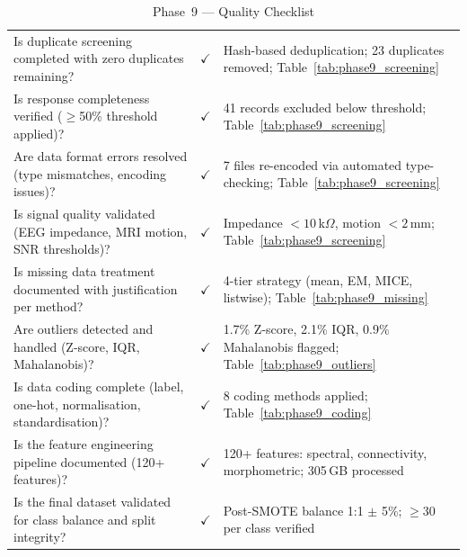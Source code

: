 \begingroup\singlespacing\tablefontsize\tablestripes
\begin{xltabular}{\textwidth}{@{} X c X @{}}
\caption{Phase~9 --- Quality Checklist}
\label{tab:phase9_checklist}\\
\toprule
{} &  &  \\
\midrule
\endfirsthead
\endhead
\bottomrule
\endlastfoot
Is duplicate screening completed with zero duplicates remaining?                  & $\checkmark$ & Hash-based deduplication; 23 duplicates removed; Table~\ref{tab:phase9_screening} \\
Is response completeness verified ($\geq$50\% threshold applied)?                & $\checkmark$ & 41 records excluded below threshold; Table~\ref{tab:phase9_screening} \\
Are data format errors resolved (type mismatches, encoding issues)?               & $\checkmark$ & 7 files re-encoded via automated type-checking; Table~\ref{tab:phase9_screening} \\
Is signal quality validated (EEG impedance, MRI motion, SNR thresholds)?          & $\checkmark$ & Impedance $< 10$\,k$\Omega$, motion $< 2$\,mm; Table~\ref{tab:phase9_screening} \\
Is missing data treatment documented with justification per method?               & $\checkmark$ & 4-tier strategy (mean, EM, MICE, listwise); Table~\ref{tab:phase9_missing} \\
Are outliers detected and handled (Z-score, IQR, Mahalanobis)?                   & $\checkmark$ & 1.7\% Z-score, 2.1\% IQR, 0.9\% Mahalanobis flagged; Table~\ref{tab:phase9_outliers} \\
Is data coding complete (label, one-hot, normalisation, standardisation)?         & $\checkmark$ & 8 coding methods applied; Table~\ref{tab:phase9_coding} \\
Is the feature engineering pipeline documented (120+ features)?                   & $\checkmark$ & 120+ features: spectral, connectivity, morphometric; 305\,GB processed \\
Is the final dataset validated for class balance and split integrity?             & $\checkmark$ & Post-SMOTE balance 1:1 $\pm$ 5\%; $\geq$30 per class verified \\
\end{xltabular}
\endgroup

\clearpage
